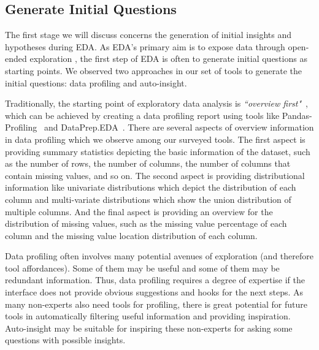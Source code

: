 \documentclass[11pt]{article}
\newcommand{\stitle}[1]{ \noindent{\bf #1.\xspace}}
\begin{document}
\subsection{Generate Initial Questions}
\label{sec:initial-question}

The first stage we will discuss concerns the generation of initial insights and hypotheses during EDA. As EDA's primary aim is to expose data through open-ended exploration \cite{tukey1977exploratory},
the first step of EDA is often to generate initial questions as starting points. We observed two approaches in our set of tools to generate the initial questions: data profiling and auto-insight. 


\stitle{Data Profiling} Traditionally, the starting point of exploratory data analysis is \emph{``overview first"}~\cite{DBLP:conf/vl/Shneiderman96}, which can be achieved by creating a data profiling report using tools like Pandas-Profiling~\cite{pandas-profiling} and DataPrep.EDA~\cite{DBLP:conf/sigmod/PengWLBYXCRW21}. There are several aspects of overview information in data profiling which we observe among our surveyed tools. The first aspect is providing summary statistics depicting the basic information of the dataset, such as the number of rows, the number of columns, the number of columns that contain missing values, and so on. The second aspect is providing distributional information like univariate distributions which depict the distribution of each column and multi-variate distributions which show the union distribution of multiple columns. And the final aspect is providing an overview for the distribution of missing values, such as the missing value percentage of each column and the missing value location distribution of each column. 

Data profiling often involves many potential avenues of exploration (and therefore tool affordances). Some of them may be useful and some of them may be redundant information. Thus, data profiling requires a degree of expertise if the interface does not provide obvious suggestions and hooks for the next steps. As many non-experts also need tools for profiling, there is great potential for future tools in automatically filtering useful information and providing inspiration. Auto-insight may be suitable for inspiring these non-experts for asking some questions with possible insights. 
\end{document}
